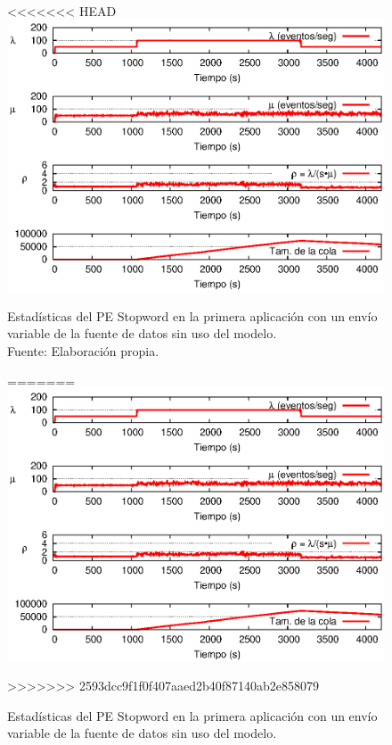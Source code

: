 \begin{figure}[!ht]
<<<<<<< HEAD
    \centering
    \captionsetup{justification=centering}
    \includegraphics[scale=1]{images/exp/app1/normal/sm/statusStopwordPE.eps}
    \caption[Estadísticas del PE Stopword en la primera aplicación con un envío variable de la fuente de datos sin uso del modelo.]{Estadísticas del PE Stopword en la primera aplicación con un envío variable de la fuente de datos sin uso del modelo.\\Fuente: Elaboración propia.}
=======
\centering
    \includegraphics[scale=1.1]{images/exp/app1/normal/sm/statusStopwordPE.eps}
    \caption{Estad\'isticas del PE Stopword en la primera aplicaci\'on con un env\'io variable de la fuente de datos sin uso del modelo.}
>>>>>>> 2593dcc9f1f0f407aaed2b40f87140ab2e858079
    \label{fig:app1-normal-statusStopwordPE-sm}
\end{figure}

